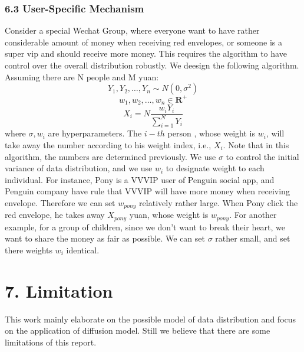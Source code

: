 \documentclass[11pt]{article}
\begin{document}
    \subsubsection*{6.3 User-Specific Mechanism}\label{user-specific-mechanism}

Consider a special Wechat Group, where everyone want to have rather
considerable amount of money when receiving red envelopes, or someone is
a super vip and should receive more money. This requires the algorithm
to have control over the overall distribution robustly. We deesign the
following algorithm. Assuming there are N people and M yuan: \[
Y_1, Y_2, \dots, Y_n \sim N(0, \sigma ^2)
\] \[
w_1, w_2, \dots, w_n \in \mathbf{R^+}
\] \[
X_i = N\frac{w_iY_i}{\sum_{i=1}^N Y_i}
\] where \(\sigma, w_i\) are hyperparameters. The \(i-th\) person ,
whose weight is \(w_i\), will take away the number according to his
weight index, i.e., \(X_i\). Note that in this algorithm, the numbers
are determined previously. We use \(\sigma\) to control the initial
variance of data distribution, and we use \(w_i\) to designate weight to
each individual. For instance, Pony is a VVVIP user of Penguin social
app, and Penguin company have rule that VVVIP will have more money when
receiving envelope. Therefore we can set \(w_{pony}\) relatively rather
large. When Pony click the red envelope, he takes away \(X_{pony}\)
yuan, whose weight is \(w_{pony}\). For another example, for a group of
children, since we don't want to break their heart, we want to share the
money as fair as possible. We can set \(\sigma\) rather small, and set
there weights \(w_i\) identical.

\section*{7. Limitation}

This work mainly elaborate on the possible model of data distribution and focus on the application of diffusion model. Still we believe that there are some limitations of this report. 
\end{document}
